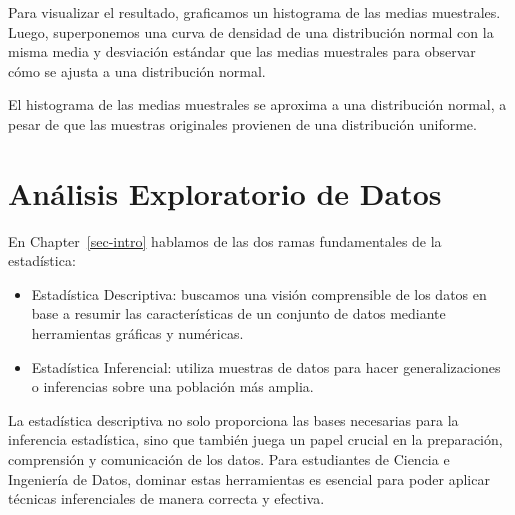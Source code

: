 \documentclass[
  letterpaper,
  DIV=11,
  numbers=noendperiod]{scrreprt}
\begin{document}
\begin{tcolorbox}
\begin{figure}[H]
{}

\end{figure}

Para visualizar el resultado, graficamos un histograma de las medias
muestrales. Luego, superponemos una curva de densidad de una
distribución normal con la misma media y desviación estándar que las
medias muestrales para observar cómo se ajusta a una distribución
normal.

El histograma de las medias muestrales se aproxima a una distribución
normal, a pesar de que las muestras originales provienen de una
distribución uniforme.

\end{tcolorbox}


\hypertarget{sec-eda}{%
\chapter{Análisis Exploratorio de Datos}\label{sec-eda}}

En Chapter~\ref{sec-intro} hablamos de las dos ramas fundamentales de la
estadística:

\begin{itemize}
\item
  Estadística Descriptiva: buscamos una visión comprensible de los datos
  en base a resumir las características de un conjunto de datos mediante
  herramientas gráficas y numéricas.
\item
  Estadística Inferencial: utiliza muestras de datos para hacer
  generalizaciones o inferencias sobre una población más amplia.
\end{itemize}

La estadística descriptiva no solo proporciona las bases necesarias para
la inferencia estadística, sino que también juega un papel crucial en la
preparación, comprensión y comunicación de los datos. Para estudiantes
de Ciencia e Ingeniería de Datos, dominar estas herramientas es esencial
para poder aplicar técnicas inferenciales de manera correcta y efectiva.
\end{document}

